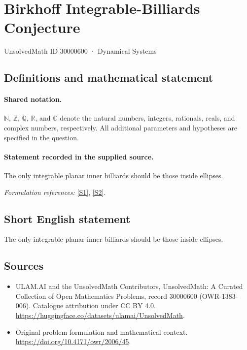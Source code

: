 \documentclass[11pt]{article}
\newcommand{\sref}[2]{\hyperlink{source:#1:#2}{[S#2]}}
\begin{document}
\setcounter{section}{30000599}
\section{Birkhoff Integrable-Billiards Conjecture}\label{30000600}
{\small UnsolvedMath ID 30000600 · Dynamical Systems}
\subsection{Definitions and mathematical statement}

\paragraph{Shared notation.}$\mathbb N$, $\mathbb Z$, $\mathbb Q$, $\mathbb R$, and $\mathbb C$ denote the natural numbers, integers, rationals, reals, and complex numbers, respectively. All additional parameters and hypotheses are specified in the question.


\paragraph{Statement recorded in the supplied source.}
The only integrable planar inner billiards should be those inside ellipses.
\par\smallskip\textit{Formulation references:} \sref{30000600}{1}, \sref{30000600}{2}.
\subsection{Short English statement}
The only integrable planar inner billiards should be those inside ellipses.
\subsection{Sources}
\begin{itemize}
\item[\hypertarget{source:30000600:1}{S1}] ULAM.AI and the UnsolvedMath Contributors, UnsolvedMath: A Curated Collection of Open Mathematics Problems, record 30000600 (OWR-1383-006). Catalogue attribution under CC BY 4.0.
\url{https://huggingface.co/datasets/ulamai/UnsolvedMath}.
\item[\hypertarget{source:30000600:2}{S2}] Original problem formulation and mathematical context.
\url{https://doi.org/10.4171/owr/2006/45}.
\end{itemize}
\label{end:30000600}
\end{document}
